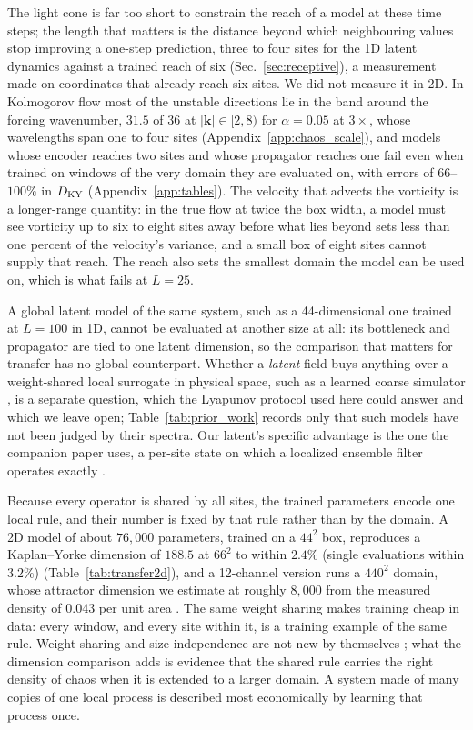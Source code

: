  The light cone is far too
short to constrain the reach of a model at these time steps; the length
that matters is the distance beyond which neighbouring values stop
improving a one-step prediction, three to four sites for the 1D latent
dynamics against a trained reach of six (Sec.~\ref{sec:receptive}), a
measurement made on coordinates that already reach six sites. We did not
measure it in 2D. In Kolmogorov flow most of the unstable directions lie
in the band around the forcing wavenumber, $31.5$ of $36$ at
$|\bm k|\in[2,8)$ for $\alpha=0.05$ at $3\times$, whose wavelengths span one to
four sites (Appendix~\ref{app:chaos_scale}), and models whose encoder
reaches two sites and whose propagator reaches one fail even when trained
on windows of the very domain they are evaluated on, with errors of
$66$--$100\%$ in $D_{\mathrm{KY}}$ (Appendix~\ref{app:tables}). The velocity that
advects the vorticity is a longer-range quantity: in the true flow at
twice the box width, a model must see vorticity up to six to eight sites
away before what lies beyond sets less than one percent of the
velocity's variance, and a small box of eight sites cannot supply that
reach. The
reach also sets the smallest domain the model can be used on, which is
what fails at $L=25$.

 A global latent model of the same system, such
as a 44-dimensional one trained at $L=100$ in 1D, cannot be evaluated at
another size at all: its bottleneck and propagator are tied to one
latent dimension, so the comparison that matters for transfer has no
global counterpart. Whether a \emph{latent} field buys anything over a
weight-shared local surrogate in physical space, such as a learned coarse
simulator \citep{kochkov2021,stachenfeld2022}, is a separate question,
which the Lyapunov protocol used here could answer and which we leave
open; Table~\ref{tab:prior_work} records only that such models have not
been judged by their spectra. Our latent's specific advantage is the one
the companion paper uses, a per-site state on which a localized ensemble
filter operates exactly \citep{jones2026da}.

 Because every
operator is shared by all sites, the trained parameters encode one local
rule, and their number is fixed by that rule rather than by the domain.
A 2D model of about $76{,}000$ parameters, trained on a $44^2$ box,
reproduces a Kaplan--Yorke dimension of $188.5$ at $66^2$ to within $2.4\%$
(single evaluations within $3.2\%$)
(Table~\ref{tab:transfer2d}), and
a 12-channel version runs a $440^2$ domain, whose attractor dimension we
estimate at roughly $8{,}000$ from the measured density of $0.043$ per unit area
\citep{jones2026da}. The same weight sharing makes training cheap in
data: every window, and every site within it, is a training example of
the same rule. Weight sharing and size independence are not new by
themselves \citep{barsinai2019,kochkov2021}; what the dimension comparison
adds is evidence that the shared rule carries the right density of chaos
when it is extended to a larger domain. A
system made of many copies of one local process is described most
economically by learning that process once.

